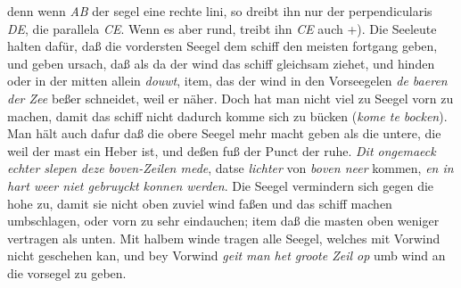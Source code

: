 denn wenn \textit{AB} der segel\protect{} eine rechte lini, so dreibt ihn nur der perpendicularis \textit{DE},  die parallela \textit{CE}. Wenn es aber rund, treibt ihn \textit{CE} auch +). Die Seeleute halten daf\"{u}r, daß die vordersten Seegel\protect{} dem schiff\protect{} den meisten fortgang\protect{} geben, und geben  ursach, daß als da der wind das schiff\protect{} gleichsam ziehet, und hinden oder in der mitten allein \textit{douwt}, item, das der wind in den Vorseegelen\protect{} \textit{de baeren der Zee} be{\ss}er schneidet, weil er n\"{a}her. Doch hat man nicht viel zu Seegel\protect{} vorn zu machen, damit das schiff\protect{} nicht dadurch komme sich zu b\"{u}cken (\textit{kome te bocken}). Man h\"{a}lt auch dafur da{\ss} die obere Seegel\protect{} mehr macht geben als die untere, die weil der mast\protect{} ein Heber\protect{} ist, und de{\ss}en fu{\ss} der Punct der ruhe. \textit{Dit ongemaeck echter slepen deze boven-Zeilen\protect{} mede}, datse \textit{lichter} von \textit{boven neer} kommen, \textit{en in hart weer niet gebruyckt konnen werden}. Die Seegel\protect{} vermindern sich gegen die hohe zu, damit sie nicht oben zuviel wind faßen und das schiff\protect{} machen umbschlagen, oder vorn zu sehr eindauchen; item daß die masten\protect{} oben weniger vertragen als unten. Mit halbem winde tragen alle Seegel\protect{}, welches mit Vorwind nicht geschehen kan, und bey Vorwind \textit{geit man het groote Zeil\protect{} op} umb wind an die vorsegel\protect{} zu geben.
\pend 
